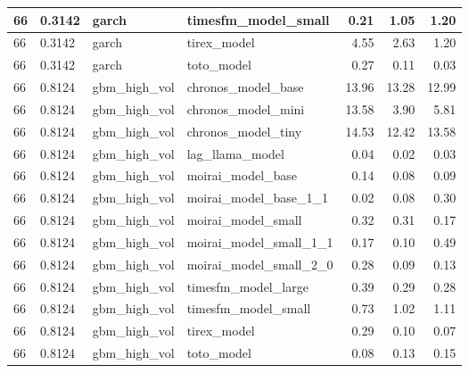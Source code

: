 {\begin{tabular}{llllrrr}
\midrule
66 & 0.3142 & garch & timesfm\_model\_small & 0.21 & 1.05 & 1.20 \\
\midrule
66 & 0.3142 & garch & tirex\_model & 4.55 & 2.63 & 1.20 \\
\midrule
66 & 0.3142 & garch & toto\_model & 0.27 & 0.11 & 0.03 \\
\midrule
66 & 0.8124 & gbm\_high\_vol & chronos\_model\_base & 13.96 & 13.28 & 12.99 \\
\midrule
66 & 0.8124 & gbm\_high\_vol & chronos\_model\_mini & 13.58 & 3.90 & 5.81 \\
\midrule
66 & 0.8124 & gbm\_high\_vol & chronos\_model\_tiny & 14.53 & 12.42 & 13.58 \\
\midrule
66 & 0.8124 & gbm\_high\_vol & lag\_llama\_model & 0.04 & 0.02 & 0.03 \\
\midrule
66 & 0.8124 & gbm\_high\_vol & moirai\_model\_base & 0.14 & 0.08 & 0.09 \\
\midrule
66 & 0.8124 & gbm\_high\_vol & moirai\_model\_base\_1\_1 & 0.02 & 0.08 & 0.30 \\
\midrule
66 & 0.8124 & gbm\_high\_vol & moirai\_model\_small & 0.32 & 0.31 & 0.17 \\
\midrule
66 & 0.8124 & gbm\_high\_vol & moirai\_model\_small\_1\_1 & 0.17 & 0.10 & 0.49 \\
\midrule
66 & 0.8124 & gbm\_high\_vol & moirai\_model\_small\_2\_0 & 0.28 & 0.09 & 0.13 \\
\midrule
66 & 0.8124 & gbm\_high\_vol & timesfm\_model\_large & 0.39 & 0.29 & 0.28 \\
\midrule
66 & 0.8124 & gbm\_high\_vol & timesfm\_model\_small & 0.73 & 1.02 & 1.11 \\
\midrule
66 & 0.8124 & gbm\_high\_vol & tirex\_model & 0.29 & 0.10 & 0.07 \\
\midrule
66 & 0.8124 & gbm\_high\_vol & toto\_model & 0.08 & 0.13 & 0.15 \\
\bottomrule
\end{tabular}
}